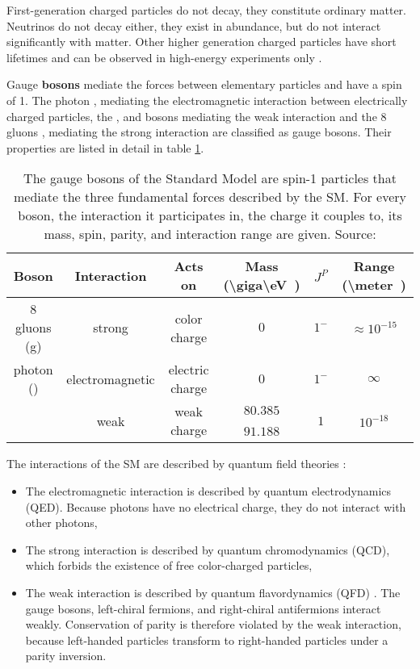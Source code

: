 First-generation charged particles do not decay, they constitute ordinary matter. Neutrinos do not decay either, they exist in abundance, but do not interact significantly with matter. Other higher generation charged particles have short lifetimes and can be observed in high-energy experiments only \cite{wiki:standardmodel}.

Gauge \textbf{bosons} mediate the forces between elementary particles and have a spin of 1. The photon \Pgg, mediating the electromagnetic interaction between electrically charged particles, the \PWp, \PWm and \PZ bosons mediating the weak interaction and the 8 gluons \Pgluon, mediating the strong interaction are classified as gauge bosons. Their properties are listed in detail in table \ref{tab:ch_1_sm_bosons}.

\begin{table}[h]
	\caption[Gauge bosons of the SM]{The gauge bosons of the Standard Model are spin-1 particles that mediate the three fundamental forces described by the SM. For every boson, the interaction it participates in, the charge it couples to, its mass, spin, parity, and interaction range are given. Source: \cite{Pov14, Fal18, Patrignani:2016xqp}}
	\label{tab:ch_1_sm_bosons}
	\begin{center}
    	\begin{tabular}{cccccc}
    		\toprule
    		Boson & Interaction & Acts on & Mass (\SI[parse-numbers = false]{\giga\eV}) & {$J^P$} & Range (\SI[parse-numbers = false]{\meter})\\
    		\midrule
    		8 gluons (g) & strong & color charge & {$0$} & {$1^-$} & $\approx 10^{-15}$\\
    		photon (\Pphoton) & electromagnetic & electric charge & {$0$} & {$1^-$} & {$\infty$}\\
    		\PWpm & \multirow{2}{*}{weak} &\multirow{2}{*}{weak charge} & {$80.385$} & \multirow{2}{*}{$1$} & \multirow{2}{*}{$10^{-18}$}\\
    		\PZz & & & {$91.188$} & &\\
    		\bottomrule
    	\end{tabular}
	\end{center}
\end{table}

The interactions of the SM are described by quantum field theories \cite{Wel17}:
\begin{itemize}
\item The electromagnetic interaction is described by quantum electrodynamics (QED). Because photons have no electrical charge, they do not interact with other photons,
\item The strong interaction is described by quantum chromodynamics (QCD), which forbids the existence of free color-charged particles,
\item The weak interaction is described by quantum flavordynamics (QFD) \cite{Gri08}. The gauge bosons, left-chiral fermions, and right-chiral antifermions interact weakly. Conservation of parity is therefore violated by the weak interaction, because left-handed particles transform to right-handed particles under a parity inversion.
\end{itemize}


